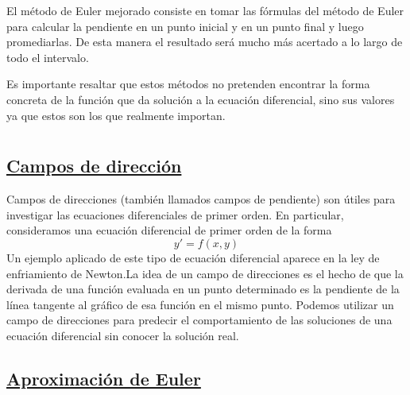 \documentclass[12 pt,letterpaper]{article}
\begin{document}
	El método de Euler mejorado consiste en tomar las fórmulas del método de Euler para calcular la pendiente en un punto inicial y en un punto final y luego promediarlas. De esta manera el resultado será mucho más acertado a lo largo de todo el intervalo.\vspace{0.4Cm}
	
	Es importante resaltar que estos métodos no pretenden encontrar la forma concreta de la función que da solución a la ecuación diferencial, sino sus valores ya que estos son los que realmente importan.\vspace{0.4Cm}
	\newpage
	
	
	\flushleft\section{\fbox{\textcolor{violet}{Aplicaciones}}}
	
	
	\flushleft\subsection{\underline{Campos de dirección}}\vspace{0.5cm}
	
	
	\begin{enumerate}
		\justify
		Campos de direcciones (también llamados campos de pendiente) son útiles para investigar las ecuaciones diferenciales de primer orden. En particular, consideramos una ecuación diferencial de primer orden de la forma\[y'=f(x,y)\]Un ejemplo aplicado de este tipo de ecuación diferencial aparece en la ley de enfriamiento de Newton.La idea de un campo de direcciones es el hecho de que la derivada de una función evaluada en un punto determinado es la pendiente de la línea tangente al gráfico de esa función en el mismo punto. Podemos utilizar un campo de direcciones para predecir el comportamiento de las soluciones de una ecuación diferencial sin conocer la solución real. 
		
	\end{enumerate} 
	
	
	\flushleft\subsection{\underline{Aproximación de Euler}}\vspace{0.5cm}
	
\end{document}
